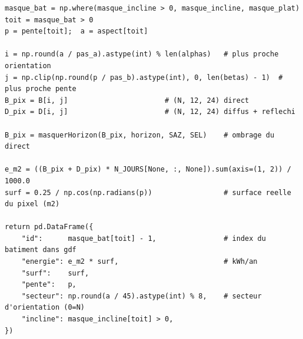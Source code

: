 \documentclass[11pt,a4paper]{article}
\begin{document}
\begin{lstlisting}
masque_bat = np.where(masque_incline > 0, masque_incline, masque_plat)
toit = masque_bat > 0
p = pente[toit];  a = aspect[toit]

i = np.round(a / pas_a).astype(int) % len(alphas)   # plus proche orientation
j = np.clip(np.round(p / pas_b).astype(int), 0, len(betas) - 1)  # plus proche pente
B_pix = B[i, j]                       # (N, 12, 24) direct
D_pix = D[i, j]                       # (N, 12, 24) diffus + reflechi

B_pix = masquerHorizon(B_pix, horizon, SAZ, SEL)    # ombrage du direct

e_m2 = ((B_pix + D_pix) * N_JOURS[None, :, None]).sum(axis=(1, 2)) / 1000.0
surf = 0.25 / np.cos(np.radians(p))                 # surface reelle du pixel (m2)

return pd.DataFrame({
    "id":      masque_bat[toit] - 1,                # index du batiment dans gdf
    "energie": e_m2 * surf,                         # kWh/an
    "surf":    surf,
    "pente":   p,
    "secteur": np.round(a / 45).astype(int) % 8,    # secteur d'orientation (0=N)
    "incline": masque_incline[toit] > 0,
})
\end{lstlisting}
\end{document}
